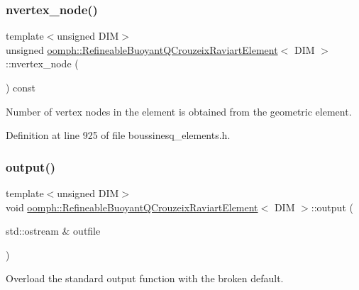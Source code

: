 \subsubsection{\texorpdfstring{nvertex\+\_\+node()}{nvertex\_node()}}
{\footnotesize\ttfamily template$<$unsigned D\+IM$>$ \\
unsigned \hyperlink{classoomph_1_1RefineableBuoyantQCrouzeixRaviartElement}{oomph\+::\+Refineable\+Buoyant\+Q\+Crouzeix\+Raviart\+Element}$<$ D\+IM $>$\+::nvertex\+\_\+node (\begin{DoxyParamCaption}{ }\end{DoxyParamCaption}) const\hspace{0.3cm}{\ttfamily [inline]}}



Number of vertex nodes in the element is obtained from the geometric element. 



Definition at line 925 of file boussinesq\+\_\+elements.\+h.

\mbox{\label{classoomph_1_1RefineableBuoyantQCrouzeixRaviartElement_abbe05b977edbfec7752ed417b90e09fa}} 
\subsubsection{\texorpdfstring{output()}{output()}\hspace{0.1cm}{\footnotesize\ttfamily [1/4]}}
{\footnotesize\ttfamily template$<$unsigned D\+IM$>$ \\
void \hyperlink{classoomph_1_1RefineableBuoyantQCrouzeixRaviartElement}{oomph\+::\+Refineable\+Buoyant\+Q\+Crouzeix\+Raviart\+Element}$<$ D\+IM $>$\+::output (\begin{DoxyParamCaption}\item[{std\+::ostream \&}]{outfile }\end{DoxyParamCaption})\hspace{0.3cm}{\ttfamily [inline]}}



Overload the standard output function with the broken default. 



